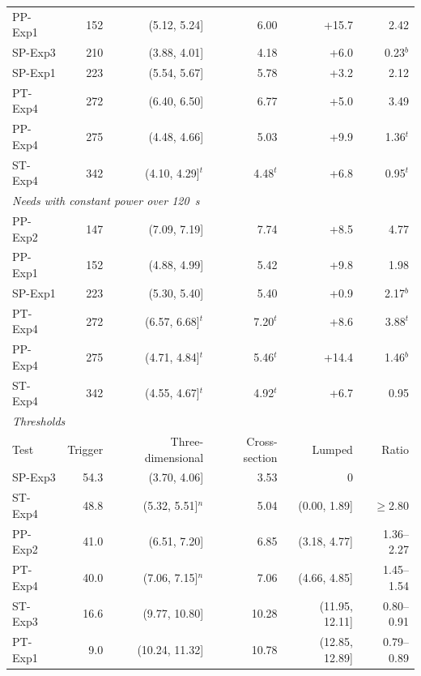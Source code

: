 \begin{table}[!tbp]
\begin{tabular}{lrrrrr}
PP-Exp1 & 152 & (5.12, 5.24] & 6.00 & +15.7 & 2.42 \\
SP-Exp3 & 210 & (3.88, 4.01] & 4.18 & +6.0 & 0.23$^{b}$ \\
SP-Exp1 & 223 & (5.54, 5.67] & 5.78 & +3.2 & 2.12 \\
PT-Exp4 & 272 & (6.40, 6.50] & 6.77 & +5.0 & 3.49 \\
PP-Exp4 & 275 & (4.48, 4.66] & 5.03 & +9.9 & 1.36$^{t}$ \\
ST-Exp4 & 342 & (4.10, 4.29]$^{t}$ & 4.48$^{t}$ & +6.8 & 0.95$^{t}$ \\
\midrule
\multicolumn{6}{l}{\textit{Needs with constant power over 120~s}} \\
PP-Exp2 & 147 & (7.09, 7.19] & 7.74 & +8.5 & 4.77 \\
PP-Exp1 & 152 & (4.88, 4.99] & 5.42 & +9.8 & 1.98 \\
SP-Exp1 & 223 & (5.30, 5.40] & 5.40 & +0.9 & 2.17$^{b}$ \\
PT-Exp4 & 272 & (6.57, 6.68]$^{t}$ & 7.20$^{t}$ & +8.6 & 3.88$^{t}$ \\
PP-Exp4 & 275 & (4.71, 4.84]$^{t}$ & 5.46$^{t}$ & +14.4 & 1.46$^{b}$ \\
ST-Exp4 & 342 & (4.55, 4.67]$^{t}$ & 4.92$^{t}$ & +6.7 & 0.95 \\
\midrule
\multicolumn{6}{l}{\textit{Thresholds}} \\
Test & Trigger & Three-dimensional & Cross-section & Lumped & Ratio \\
\midrule
SP-Exp3 & 54.3 & (3.70, 4.06] & 3.53 & 0 &  \\
ST-Exp4 & 48.8 & (5.32, 5.51]$^{n}$ & 5.04 & (0.00, 1.89] & $\geq$2.80 \\
PP-Exp2 & 41.0 & (6.51, 7.20] & 6.85 & (3.18, 4.77] & 1.36--2.27 \\
PT-Exp4 & 40.0 & (7.06, 7.15]$^{n}$ & 7.06 & (4.66, 4.85] & 1.45--1.54 \\
ST-Exp3 & 16.6 & (9.77, 10.80] & 10.28 & (11.95, 12.11] & 0.80--0.91 \\
PT-Exp1 & 9.0 & (10.24, 11.32] & 10.78 & (12.85, 12.89] & 0.79--0.89 \\
\bottomrule
\end{tabular}
\end{table}
